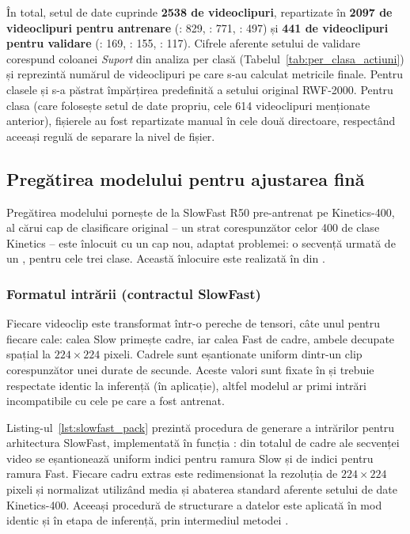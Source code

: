 \documentclass[../../main.tex]{subfiles}
\begin{document}
În total, setul de date cuprinde \textbf{2538 de videoclipuri}, repartizate în \textbf{2097 de videoclipuri pentru antrenare} (: 829, : 771, : 497) și \textbf{441 de videoclipuri pentru validare} (: 169, : 155, : 117). Cifrele aferente setului de validare corespund coloanei \textit{Suport} din analiza per clasă (Tabelul~\ref{tab:per_clasa_actiuni}) și reprezintă numărul de videoclipuri pe care s-au calculat metricile finale. Pentru clasele  și  s-a păstrat împărțirea predefinită a setului original RWF-2000. Pentru clasa  (care folosește setul de date propriu, cele 614 videoclipuri menționate anterior), fișierele au fost repartizate manual în cele două directoare, respectând aceeași regulă de separare la nivel de fișier.

\subsection{Pregătirea modelului pentru ajustarea fină}
\label{subsec:pregatire_finetuning}

Pregătirea modelului pornește de la SlowFast R50 pre-antrenat pe Kinetics-400, al cărui cap de
clasificare original -- un strat  corespunzător celor 400 de clase
Kinetics -- este înlocuit cu un cap nou, adaptat problemei: o secvență
 urmată de un , pentru cele trei clase. Această
înlocuire este realizată în  din
.

\subsubsection{Formatul intrării (contractul SlowFast)}
Fiecare videoclip este transformat într-o pereche de tensori, câte unul pentru fiecare cale:
calea Slow primește  cadre, iar calea Fast  de cadre, ambele decupate
spațial la $224 \times 224$ pixeli. Cadrele sunt eșantionate uniform dintr-un clip
corespunzător unei durate de  secunde. Aceste valori sunt fixate în
 și trebuie respectate identic la inferență (în aplicație), altfel
modelul ar primi intrări incompatibile cu cele pe care a fost antrenat.

Listing-ul~\ref{lst:slowfast_pack} prezintă procedura de generare a intrărilor pentru arhitectura SlowFast, implementată în funcția : din totalul de  cadre ale secvenței video se eșantionează uniform  indici pentru ramura Slow și  de indici pentru ramura Fast. Fiecare cadru extras este redimensionat la rezoluția de $224 \times 224$ pixeli și normalizat utilizând media și abaterea standard aferente setului de date Kinetics-400. Aceeași procedură de structurare a datelor este aplicată în mod identic și în etapa de inferență, prin intermediul metodei .
\end{document}
